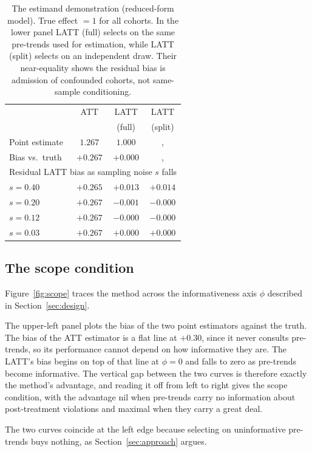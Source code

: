 \documentclass[12pt]{article}
\theoremstyle{remark}
\begin{document}
\begin{table}[t]
\centering
\caption{The estimand demonstration (reduced-form model). True effect $=1$ for all cohorts. In the lower
panel LATT (full) selects on the same pre-trends used for estimation, while LATT (split) selects on an
independent draw. Their near-equality shows the residual bias is admission of confounded cohorts, not
same-sample conditioning.}
\label{tab:tier1}
\begin{tabular}{lccc}
\toprule
& ATT & LATT & LATT \\
& & (full) & (split) \\
\midrule
Point estimate & $1.267$ & $1.000$ &, \\
Bias vs.\ truth & $+0.267$ & $+0.000$ &, \\
\midrule
\multicolumn{4}{l}{Residual LATT bias as sampling noise $s$ falls}\\
$s=0.40$ & $+0.265$ & $+0.013$ & $+0.014$ \\
$s=0.20$ & $+0.267$ & $-0.001$ & $-0.000$ \\
$s=0.12$ & $+0.267$ & $-0.000$ & $-0.000$ \\
$s=0.03$ & $+0.267$ & $+0.000$ & $+0.000$ \\
\bottomrule
\end{tabular}
\end{table}

\subsection{The scope condition}

Figure~\ref{fig:scope} traces the method across the informativeness axis $\phi$ described in
Section~\ref{sec:design}.

The upper-left panel plots the bias of the two point estimators against the truth. The bias of the ATT
estimator is a flat line at $+0.30$, since it never consults pre-trends, so its performance cannot depend
on how informative they are. The LATT's bias begins on top of that line at $\phi=0$ and falls to
zero as pre-trends become informative. The vertical gap between the two curves is therefore exactly the
method's advantage, and reading it off from left to right gives the scope condition, with the advantage
nil when pre-trends carry no information about post-treatment violations and maximal when they carry a
great deal.

The two curves coincide at the left edge because selecting on uninformative pre-trends buys nothing, as
Section~\ref{sec:approach} argues.
\end{document}
